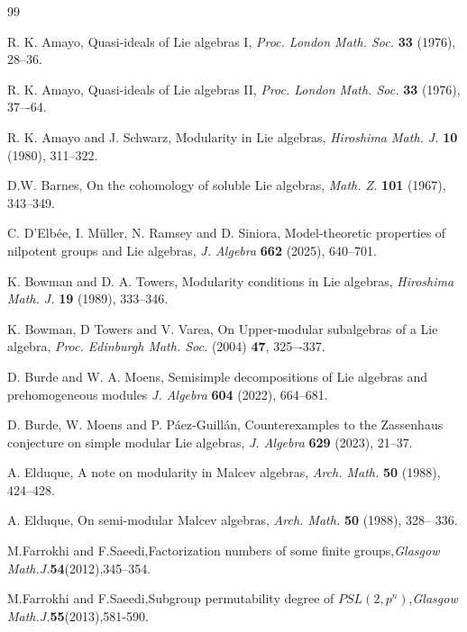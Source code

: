 \documentclass{amsart}
\theoremstyle{definition}
\numberwithin{equation}{section}
\begin{document}
\begin{thebibliography}{99}

 R. K. Amayo, Quasi-ideals of Lie algebras I, \textit{Proc. London Math. Soc.} \textbf{33} (1976), 28--36.

 R. K. Amayo, Quasi-ideals of Lie algebras II, \textit{Proc. London Math. Soc.}  \textbf{33} (1976), 37–-64.

 R. K. Amayo and J. Schwarz, Modularity in Lie algebras, \textit{Hiroshima Math. J.} \textbf{10} (1980), 311--322.


 D.W. Barnes, On the cohomology of soluble Lie algebras, \textit{Math. Z.} \textbf{101} (1967), 343--349.

 C. D'Elb\'ee, I. M\"uller, N. Ramsey and D. Siniora,  Model-theoretic properties of nilpotent groups and Lie algebras, \textit{J. Algebra} \textbf{662} (2025),  640--701.




 K. Bowman and D. A. Towers, Modularity conditions in Lie algebras, \textit{Hiroshima Math. J.} \textbf{19} (1989), 333--346.


 K. Bowman, D Towers and V. Varea,  On Upper-modular subalgebras of a Lie algebra,  \textit{Proc.  Edinburgh Math. Soc.} (2004) \textbf{47}, 325–-337. 




 D. Burde and W. A. Moens,  Semisimple decompositions of Lie algebras and prehomogeneous modules  \textit{J. Algebra}  \textbf{604} (2022), 664--681.

D. Burde, W. Moens and P. P\'aez-Guill\'an, Counterexamples to the Zassenhaus conjecture on simple modular Lie algebras, \textit{J. Algebra} \textbf{629} (2023), 21--37.



 A. Elduque, A note on modularity in Malcev algebras, \textit{Arch. Math.} \textbf{50} (1988), 424--428.

  A. Elduque, On semi-modular Malcev algebras, \textit{Arch. Math.} \textbf{50} (1988), 328-- 336.


M.Farrokhi and F.Saeedi,Factorization numbers of some finite groups,\textit{Glasgow Math.J.}\textbf{54}(2012),345--354.


 M.Farrokhi and F.Saeedi,Subgroup permutability degree of $PSL(2,p^n)$,\textit{Glasgow Math.J.}\textbf{55}(2013),581-590.



\end{thebibliography}
\end{document}
